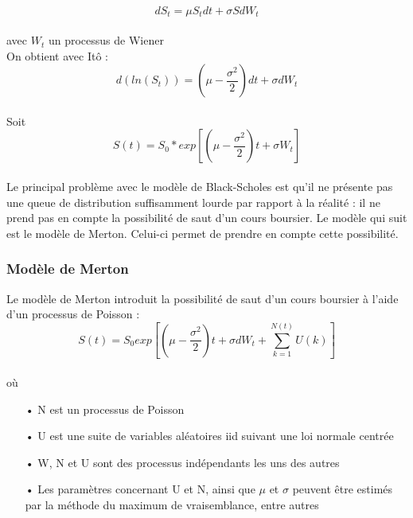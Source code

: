 \documentclass[french,12pt,a4paper]{article}
\begin{document}
$$ dS_t = \mu S_tdt + \sigma SdW_t $$ \\
avec $W_{t}$ un processus de Wiener \\

On obtient avec Itô : \\
$$ d(ln(S_t))=(\mu - \frac{\sigma^{2}}{2})dt + \sigma dW_t $$ \\
Soit \\
$$ S(t) = S_{0} * exp \left[(\mu - \frac{\sigma^{2}}{2})t + \sigma W_t \right] $$ \\

Le principal problème avec le modèle de Black-Scholes est qu'il ne présente pas une queue de distribution suffisamment lourde par rapport à la réalité : il ne prend pas en compte la possibilité de saut d'un cours boursier. Le modèle qui suit est le modèle de Merton. Celui-ci permet de prendre en compte cette possibilité.\\

\subsubsection{Modèle de Merton}
Le modèle de Merton introduit la possibilité de saut d'un cours boursier à l'aide d'un processus de Poisson :\\

$$ S(t) = S_{0} exp \left[(\mu - \frac{\sigma^{2}}{2})t + \sigma dW_t + \sum_{k=1}^{N(t)} U(k) \right] $$ \\
où
\begin{itemize}
\item[•] N est un processus de Poisson
\item[•] U est une suite de variables aléatoires iid suivant une loi normale centrée
\item[•] W, N et U sont des processus indépendants les uns des autres
\item[•] Les paramètres concernant U et N, ainsi que $\mu$ et $\sigma$ peuvent être estimés par la méthode du maximum de vraisemblance, entre autres
\end{itemize}
\\
\end{document}
